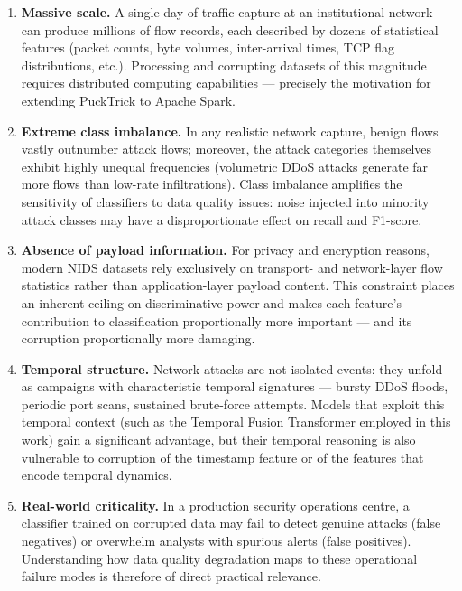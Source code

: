 \begin{enumerate}
    \item \textbf{Massive scale.}  A single day of traffic capture at an
          institutional network can produce millions of flow records, each
          described by dozens of statistical features (packet counts, byte
          volumes, inter-arrival times, TCP flag distributions, etc.).
          Processing and corrupting datasets of this magnitude requires
          distributed computing capabilities — precisely the motivation for
          extending PuckTrick to Apache Spark.
    \item \textbf{Extreme class imbalance.}  In any realistic network
          capture, benign flows vastly outnumber attack flows; moreover, the
          attack categories themselves exhibit highly unequal frequencies
          (volumetric DDoS attacks generate far more flows than low-rate
          infiltrations).  Class imbalance amplifies the sensitivity of
          classifiers to data quality issues: noise injected into minority
          attack classes may have a disproportionate effect on recall and
          F1-score.
    \item \textbf{Absence of payload information.}  For privacy and
          encryption reasons, modern NIDS datasets rely exclusively on
          transport- and network-layer flow statistics rather than
          application-layer payload content.  This constraint places an
          inherent ceiling on discriminative power and makes each feature's
          contribution to classification proportionally more important — and
          its corruption proportionally more damaging.
    \item \textbf{Temporal structure.}  Network attacks are not isolated
          events: they unfold as campaigns with characteristic temporal
          signatures — bursty DDoS floods, periodic port scans, sustained
          brute-force attempts.  Models that exploit this temporal context
          (such as the Temporal Fusion Transformer employed in this work)
          gain a significant advantage, but their temporal reasoning is also
          vulnerable to corruption of the timestamp feature or of the features
          that encode temporal dynamics.
    \item \textbf{Real-world criticality.}  In a production security
          operations centre, a classifier trained on corrupted data may fail
          to detect genuine attacks (false negatives) or overwhelm analysts
          with spurious alerts (false positives).  Understanding how data
          quality degradation maps to these operational failure modes is
          therefore of direct practical relevance.
\end{enumerate}

